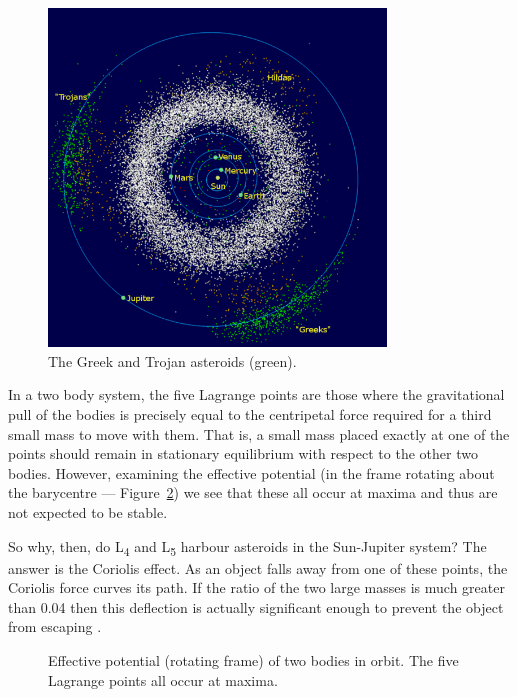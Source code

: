 \documentclass[a4paper]{article}
\begin{document}
    \begin{figure}
      \centering
      \caption{The Greek and Trojan asteroids (green). \cite{asteroids}}
      \label{fig:trojans}
      \includegraphics[width=0.8\textwidth]{figures/trojans}
    \end{figure}

    In a two body system, the five Lagrange points are those where the
    gravitational pull of the bodies is precisely equal to the centripetal
    force required for a third small mass to move with them. That is, a small
    mass placed exactly at one of the points should remain in stationary
    equilibrium with respect to the other two bodies. However, examining the
    effective potential (in the frame rotating about the barycentre ---
    Figure~\ref{fig:potential}) we see that these all occur at maxima and thus
    are not expected to be stable.

    So why, then, do L\textsubscript{4} and L\textsubscript{5} harbour
    asteroids in the Sun-Jupiter system? The answer is the Coriolis effect. As
    an object falls away from one of these points, the Coriolis force curves
    its path. If the ratio of the two large masses is much greater than 0.04
    then this deflection is actually significant enough to prevent the object
    from escaping \cite{greenspan}.

    \begin{figure}
      \centering
      \caption{Effective potential (rotating frame) of two bodies in
                orbit. The five Lagrange points all occur at maxima.
                \cite{wmap}}
      \label{fig:potential}
      
    \end{figure}
\end{document}
